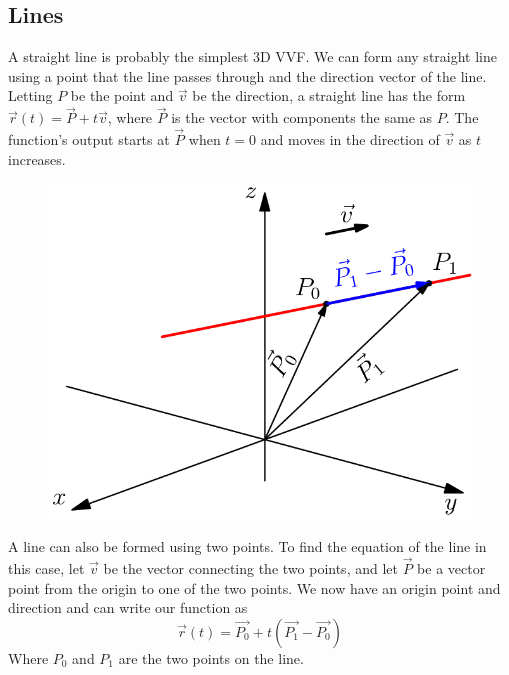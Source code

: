 \subsection{Lines}
\noindent
A straight line is probably the simplest 3D VVF. We can form any straight line using a point that the line passes through and the direction vector of the line.\\
Letting $P$ be the point and $\vec{v}$ be the direction, a straight line has the form $\vec{r}(t) = \vec{P}+t\vec{v}$, where $\vec{P}$ is the vector with components the same as $P$. The function's output starts at $\vec{P}$ when $t=0$ and moves in the direction of $\vec{v}$ as $t$ increases.

\begin{figure}[H]
	\centering
	\includegraphics[scale=0.33]{Images/vectorValuedFunctions/VectorLine}
\end{figure}

\noindent
A line can also be formed using two points. To find the equation of the line in this case, let $\vec{v}$ be the vector connecting the two points, and let $\vec{P}$ be a vector point from the origin to one of the two points. We now have an origin point and direction and can write our function as
\begin{equation*}
	\vec{r}(t) = \vec{P_0} + t\left(\vec{P_1} - \vec{P_0}\right)	
\end{equation*}
 Where $P_0$ and $P_1$ are the two points on the line.